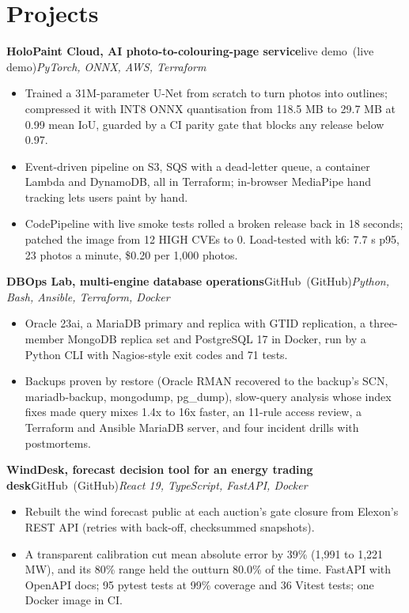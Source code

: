 \documentclass[10pt,a4paper]{article}
\newcommand{\project}[3]{%
  \textbf{#1}\ifx\relax#3\relax\else\ (#3)\fi\hfill{\itshape #2}\par
}
\begin{document}
\section{Projects}
\project{HoloPaint Cloud, AI photo-to-colouring-page service}{PyTorch, ONNX, AWS, Terraform}{live demo}
\begin{itemize}
  \item Trained a 31M-parameter U-Net from scratch to turn photos into outlines; compressed it with INT8 ONNX quantisation from 118.5 MB to 29.7 MB at 0.99 mean IoU, guarded by a CI parity gate that blocks any release below 0.97.
  \item Event-driven pipeline on S3, SQS with a dead-letter queue, a container Lambda and DynamoDB, all in Terraform; in-browser MediaPipe hand tracking lets users paint by hand.
  \item CodePipeline with live smoke tests rolled a broken release back in 18 seconds; patched the image from 12 HIGH CVEs to 0. Load-tested with k6: 7.7 s p95, 23 photos a minute, \$0.20 per 1,000 photos.
\end{itemize}
\project{DBOps Lab, multi-engine database operations}{Python, Bash, Ansible, Terraform, Docker}{GitHub}
\begin{itemize}
  \item Oracle 23ai, a MariaDB primary and replica with GTID replication, a three-member MongoDB replica set and PostgreSQL 17 in Docker, run by a Python CLI with Nagios-style exit codes and 71 tests.
  \item Backups proven by restore (Oracle RMAN recovered to the backup's SCN, mariadb-backup, mongodump, pg\_dump), slow-query analysis whose index fixes made query mixes 1.4x to 16x faster, an 11-rule access review, a Terraform and Ansible MariaDB server, and four incident drills with postmortems.
\end{itemize}
\project{WindDesk, forecast decision tool for an energy trading desk}{React 19, TypeScript, FastAPI, Docker}{GitHub}
\begin{itemize}
  \item Rebuilt the wind forecast public at each auction's gate closure from Elexon's REST API (retries with back-off, checksummed snapshots).
  \item A transparent calibration cut mean absolute error by 39\% (1,991 to 1,221 MW), and its 80\% range held the outturn 80.0\% of the time. FastAPI with OpenAPI docs; 95 pytest tests at 99\% coverage and 36 Vitest tests; one Docker image in CI.
\end{itemize}
\end{document}
